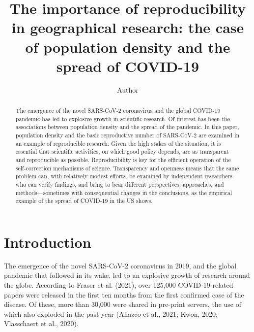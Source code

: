 \documentclass[]{elsarticle} %
\begin{document}
\begin{frontmatter}

  \title{The importance of reproducibility in geographical research: the
case of population density and the spread of COVID-19}
    \author[University]{Author}
      \address[University]{Department, Street, City, State ZIP}
  
  \begin{abstract}
  The emergence of the novel SARS-CoV-2 coronavirus and the global
  COVID-19 pandemic has led to explosive growth in scientific research.
  Of interest has been the associations between population density and
  the spread of the pandemic. In this paper, population density and the
  basic reproductive number of SARS-CoV-2 are examined in an example of
  reproducible research. Given the high stakes of the situation, it is
  essential that scientific activities, on which good policy depends,
  are as transparent and reproducible as possible. Reproducibility is
  key for the efficient operation of the self-correction mechanisms of
  science. Transparency and openness means that the same problem can,
  with relatively modest efforts, be examined by independent researchers
  who can verify findings, and bring to bear different perspectives,
  approaches, and methods---sometimes with consequential changes in the
  conclusions, as the empirical example of the spread of COVID-19 in the
  US shows.
  \end{abstract}
  
 \end{frontmatter}

\newpage

\hypertarget{introduction}{%
\section{Introduction}\label{introduction}}

The emergence of the novel SARS-CoV-2 coronavirus in 2019, and the
global pandemic that followed in its wake, led to an explosive growth of
research around the globe. According to Fraser et al. (2021), over
125,000 COVID-19-related papers were released in the first ten months
from the first confirmed case of the disease. Of these, more than 30,000
were shared in pre-print servers, the use of which also exploded in the
past year (Añazco et al., 2021; Kwon, 2020; Vlasschaert et al., 2020).
\end{document}
